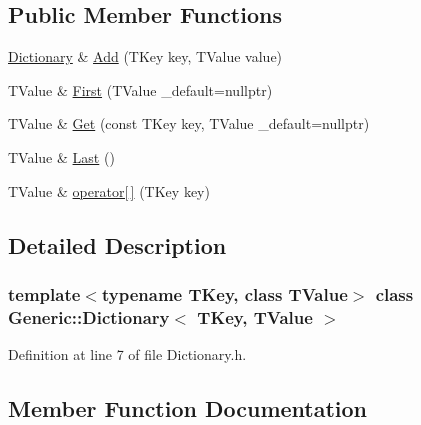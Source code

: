 \subsection*{Public Member Functions}
\begin{DoxyCompactItemize}
\item 
\mbox{\hyperlink{classGeneric_1_1Dictionary}{Dictionary}} \& \mbox{\hyperlink{classGeneric_1_1Dictionary_ae7cb006f801b21c172e8fbac8794fa99}{Add}} (T\+Key key, T\+Value value)
\item 
T\+Value \& \mbox{\hyperlink{classGeneric_1_1Dictionary_ab368d54de28e7a3514e1add4bb5b3a36}{First}} (T\+Value \+\_\+default=nullptr)
\item 
T\+Value \& \mbox{\hyperlink{classGeneric_1_1Dictionary_ad018bc166486129b48e9ededce313984}{Get}} (const T\+Key key, T\+Value \+\_\+default=nullptr)
\item 
T\+Value \& \mbox{\hyperlink{classGeneric_1_1Dictionary_ab4c4fca6ab2ea15fcccd88fe2213575e}{Last}} ()
\item 
T\+Value \& \mbox{\hyperlink{classGeneric_1_1Dictionary_a215ba40a8ff1006d0bf288a317758d3f}{operator\mbox{[}$\,$\mbox{]}}} (T\+Key key)
\end{DoxyCompactItemize}


\subsection{Detailed Description}
\subsubsection*{template$<$typename T\+Key, class T\+Value$>$\newline
class Generic\+::\+Dictionary$<$ T\+Key, T\+Value $>$}



Definition at line 7 of file Dictionary.\+h.



\subsection{Member Function Documentation}
\mbox{\label{classGeneric_1_1Dictionary_ae7cb006f801b21c172e8fbac8794fa99}} 
